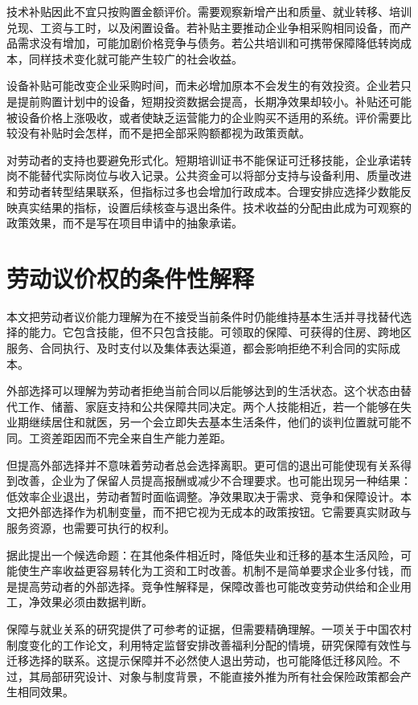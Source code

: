 \documentclass[UTF8,fontset=fandol,zihao=-4,oneside,openany]{ctexbook}
\begin{document}
技术补贴因此不宜只按购置金额评价。需要观察新增产出和质量、就业转移、培训兑现、工资与工时，以及闲置设备。若补贴主要推动企业争相采购相同设备，而产品需求没有增加，可能加剧价格竞争与债务。若公共培训和可携带保障降低转岗成本，同样技术变化就可能产生较广的社会收益。

\label{arg:P071}
设备补贴可能改变企业采购时间，而未必增加原本不会发生的有效投资。企业若只是提前购置计划中的设备，短期投资数据会提高，长期净效果却较小。补贴还可能被设备价格上涨吸收，或者使缺乏运营能力的企业购买不适用的系统。评价需要比较没有补贴时会怎样，而不是把全部采购额都视为政策贡献。

对劳动者的支持也要避免形式化。短期培训证书不能保证可迁移技能，企业承诺转岗不能替代实际岗位与收入记录。公共资金可以将部分支持与设备利用、质量改进和劳动者转型结果联系，但指标过多也会增加行政成本。合理安排应选择少数能反映真实结果的指标，设置后续核查与退出条件。技术收益的分配由此成为可观察的政策效果，而不是写在项目申请中的抽象承诺。

\section{劳动议价权的条件性解释}
本文把劳动者议价能力理解为在不接受当前条件时仍能维持基本生活并寻找替代选择的能力。它包含技能，但不只包含技能。可领取的保障、可获得的住房、跨地区服务、合同执行、及时支付以及集体表达渠道，都会影响拒绝不利合同的实际成本。

\label{arg:P072}
外部选择可以理解为劳动者拒绝当前合同以后能够达到的生活状态。这个状态由替代工作、储蓄、家庭支持和公共保障共同决定。两个人技能相近，若一个能够在失业期继续居住和就医，另一个会立即失去基本生活条件，他们的谈判位置就可能不同。工资差距因而不完全来自生产能力差距。

但提高外部选择并不意味着劳动者总会选择离职。更可信的退出可能使现有关系得到改善，企业为了保留人员提高报酬或减少不合理要求。也可能出现另一种结果：低效率企业退出，劳动者暂时面临调整。净效果取决于需求、竞争和保障设计。本文把外部选择作为机制变量，而不把它视为无成本的政策按钮。它需要真实财政与服务资源，也需要可执行的权利。

据此提出一个候选命题：在其他条件相近时，降低失业和迁移的基本生活风险，可能使生产率收益更容易转化为工资和工时改善。机制不是简单要求企业多付钱，而是提高劳动者的外部选择。竞争性解释是，保障改善也可能改变劳动供给和企业用工，净效果必须由数据判断。

\label{arg:P073}
保障与就业关系的研究提供了可参考的证据，但需要精确理解。一项关于中国农村制度变化的工作论文，利用特定监督安排改善福利分配的情境，研究保障有效性与迁移选择的联系。这提示保障并不必然使人退出劳动，也可能降低迁移风险。不过，其局部研究设计、对象与制度背景，不能直接外推为所有社会保险政策都会产生相同效果。\cite{Migration2023}
\end{document}
